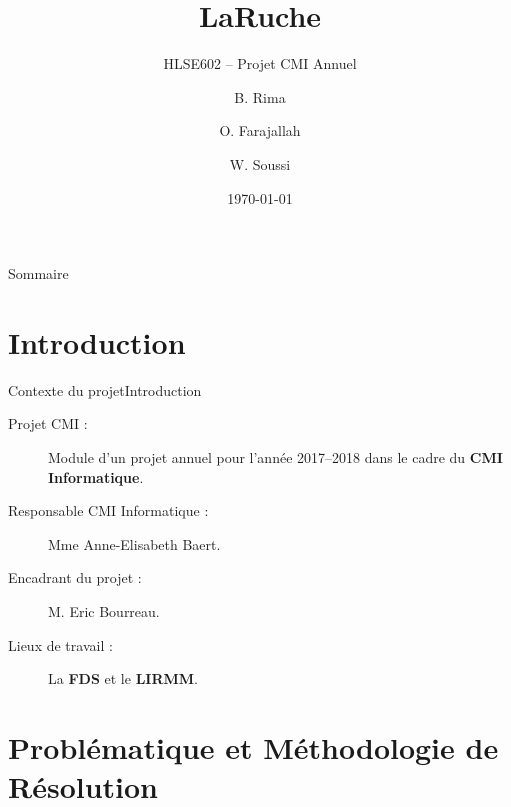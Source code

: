 \documentclass[usenames,dvipsnames]{beamer}
\title{LaRuche}
\subtitle{HLSE602 -- Projet CMI Annuel}
\author{B. Rima \and O. Farajallah \and W. Soussi}
\institute[UM]{L3 CMI Informatique}
\date{\today}
\begin{document}
\begin{frame}
\titlepage
\end{frame}
\begin{frame}{Sommaire}
\tableofcontents
\end{frame}
\section{Introduction}
\begin{frame}{Contexte du projet}{Introduction}
  \begin{description}
    \item [Projet CMI :] Module d'un projet annuel pour l'année 2017--2018 dans le cadre du \textbf{CMI Informatique}.
    \item [Responsable CMI Informatique :] Mme Anne-Elisabeth Baert.
    \item [Encadrant du projet :] M. Eric Bourreau.
    \item [Lieux de travail :] La \textbf{FDS} et le \textbf{LIRMM}.
  \end{description}
\end{frame}

\section{Problématique et Méthodologie de Résolution}
\end{document}
